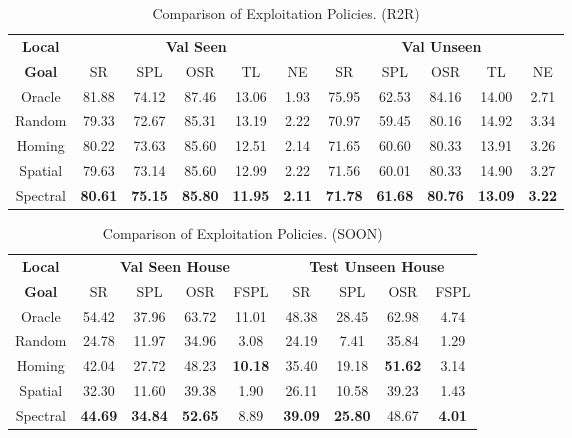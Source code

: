 \documentclass[10pt,twocolumn,letterpaper]{article}
\begin{document}
\begin{table}[htb!]
\renewcommand{\arraystretch}{0.9}
\setlength{\tabcolsep}{2.5pt}
\fontsize{7}{8}\selectfont
\begin{tabular}{c|ccccc|ccccc}
\toprule
\textbf{Local} & \multicolumn{5}{c|}{\textbf{Val Seen}} & \multicolumn{5}{c}{\textbf{Val Unseen}}\\
\textbf{Goal} & SR & SPL & OSR & TL & NE & SR & SPL & OSR & TL & NE \\ \hline\hline
Oracle & 81.88 & 74.12 & 87.46 & 13.06 & 1.93 & 75.95 & 62.53 & 84.16 & 14.00 & 2.71 \\ \hline
Random  & 79.33 & 72.67 & 85.31 & 13.19 & 2.22 & 70.97 & 59.45 & 80.16 & 14.92 & 3.34 \\
Homing  & 80.22 & 73.63 & 85.60 & 12.51 & 2.14 & 71.65 & 60.60 & 80.33 & 13.91 & 3.26 \\
Spatial  & 79.63 & 73.14 & 85.60 & 12.99 & 2.22 & 71.56 & 60.01 & 80.33 & 14.90 & 3.27 \\
\rowcolor{LightCyan}Spectral  & \textbf{80.61} & \textbf{75.15} & \textbf{85.80} & \textbf{11.95} & \textbf{2.11} & \textbf{71.78} & \textbf{61.68} & \textbf{80.76} & \textbf{13.09} & \textbf{3.22} \\
\bottomrule
\end{tabular}\vspace{-0.2cm}
\caption{\small Comparison of Exploitation Policies. (R2R)
}
\label{tab:localgoal_compare_results-r2r}\vspace{-0.6cm}
\end{table}
\begin{table}[htb!]
\renewcommand{\arraystretch}{0.9}
\setlength{\tabcolsep}{4.06pt}
\fontsize{7}{8}\selectfont
\begin{tabular}{c|cccc|cccc}
\toprule
\textbf{Local} & \multicolumn{4}{c|}{\textbf{Val Seen House}} & \multicolumn{4}{c}{\textbf{Test Unseen House}}\\
\textbf{Goal} & SR & SPL & OSR & FSPL & SR & SPL & OSR & FSPL \\ \hline\hline
Oracle  & 54.42 & 37.96 & 63.72 & 11.01 & 48.38 & 28.45 & 62.98 & 4.74 \\ \hline
Random   & 24.78 & 11.97 & 34.96 & 3.08 & 24.19 & 7.41 & 35.84 & 1.29 \\
Homing   & 42.04 & 27.72 & 48.23 & \textbf{10.18} & 35.40 & 19.18 & \textbf{51.62} & 3.14 \\
Spatial  & 32.30 & 11.60 & 39.38 & 1.90 & 26.11 & 10.58 & 39.23 & 1.43 \\
\rowcolor{LightCyan}Spectral & \textbf{44.69} & \textbf{34.84} & \textbf{52.65} & 8.89 & \textbf{39.09} & \textbf{25.80} & 48.67 & \textbf{4.01} \\
\bottomrule
\end{tabular}\vspace{-0.2cm}
\caption{\small Comparison of Exploitation Policies. (SOON)
}
\label{tab:localgoal_compare_results-soon}\vspace{-0.8cm}
\end{table}
\end{document}
